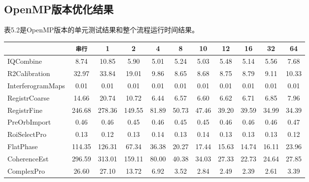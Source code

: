 \subsection{OpenMP版本优化结果}

表5.2是OpenMP版本的单元测试结果和整个流程运行时间结果。

\begin{table}[!htbp]
    \label{tab:5_insar_openmp_result}
    \centering
    \footnotesize
    \setlength{\tabcolsep}{4pt}
    \renewcommand{\arraystretch}{1.2} 
    \begin{tabular}{|l|c|c|c|c|c|c|c|c|c|c|}
        \hline
	\diagbox{算法}{线程数}  &   \texttt{串行}	&   1	    &   2	    &   4	    &   8	    &   10	    &   12	    &   16	    &   32	    &   64      \\ \hline
		IQCombine	        &   8.74	&   10.85	&   5.90	&   5.01	&   5.24	&   5.03	&   5.48	&   5.14	&   5.56	&   7.68      \\ \hline
		R2Calibration	    &   32.97	&   33.84	&   19.01	&   9.86	&   8.65	&   8.68	&   8.75	&   8.79	&   9.11	&   10.33      \\ \hline
		InterferogramMaps	&   0.01	&   0.01	&   0.01	&   0.01	&   0.01	&   0.01	&   0.01	&   0.01	&   0.01	&   0.01      \\ \hline
		RegistrCoarse	    &   14.66	&   20.74	&   10.72	&   6.44	&   6.57	&   6.60	&   6.62	&   6.71	&   6.85	&   7.96      \\ \hline
		RegistrFine	        &   246.68	&   278.36	&   149.55	&   81.89	&   50.73	&   47.46	&   39.20	&   39.59	&   34.99	&   34.39      \\ \hline
		PreOrbImport	    &   0.46	&   0.46	&   0.45	&   0.46	&   0.45	&   0.45	&   0.46	&   0.46	&   0.46	&   0.47      \\ \hline
		RoiSelectPro	    &   0.13	&   0.12	&   0.13	&   0.14	&   0.13	&   0.14	&   0.13	&   0.13	&   0.13	&   0.12      \\ \hline
		FlatPhase	        &   114.35	&   126.31	&   67.34	&   36.38	&   20.27	&   17.44	&   15.63	&   14.74	&   16.11	&   23.96      \\ \hline
		CoherenceEst	    &   296.59	&   313.01	&   159.11	&   80.00	&   40.38	&   34.03	&   27.33	&   22.73	&   24.64	&   27.85      \\ \hline
		ComplexPro	        &   26.60	&   27.10	&   13.72	&   6.92	&   3.52	&   2.84	&   2.49	&   2.39	&   2.61	&   3.39      \\ \hline

\end{tabular}
\end{table}
